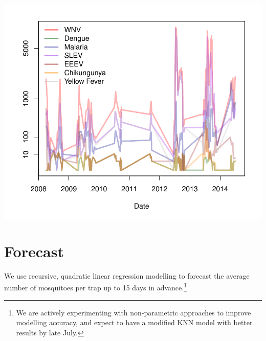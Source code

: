 \documentclass{article}
\begin{document}
\begin{multicols}{2}
\includegraphics{mosquitoReport-005}

\vfill
\newpage
\end{multicols}

\section*{Forecast}
\hrulefill
\vspace{5mm}

\noindent We use recursive, quadratic linear regression modelling to forecast the average number of mosquitoes per trap up to 15 days in advance.\footnote{We are actively experimenting with non-parametric approaches to improve modelling accuracy, and expect to have a modified KNN model with better results by late July.}  
\end{document}
